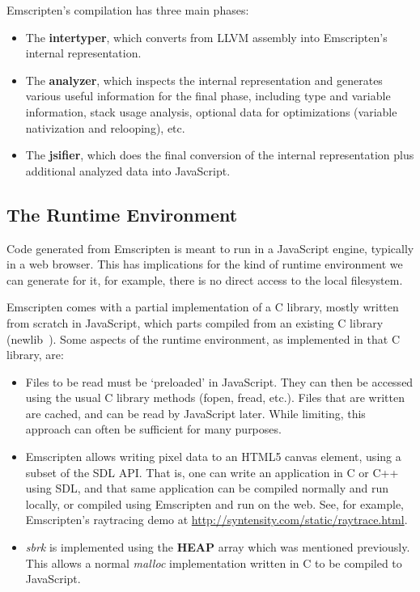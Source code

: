 \documentclass[11pt]{proc}
\begin{document}
Emscripten's compilation has three main phases:
\begin{itemize}
\item The \textbf{intertyper}, which converts from LLVM assembly into
      Emscripten's internal representation.
\item The \textbf{analyzer}, which inspects the internal representation
      and generates various useful information for the final phase,
      including type and variable information, stack usage analysis,
      optional data for optimizations
      (variable nativization and relooping), etc.
\item The \textbf{jsifier}, which does the final conversion of the
      internal representation plus additional analyzed data into JavaScript.
\end{itemize}

\subsection{The Runtime Environment}

Code generated from Emscripten is meant to run in a JavaScript engine,
typically in a web browser. This has implications for the kind of
runtime environment we can generate for it, for example, there is no
direct access to the local filesystem.

Emscripten comes with a partial implementation of a C library,
mostly written from scratch in JavaScript, which parts compiled from an
existing C library (newlib~\cite{newlib}). Some aspects of the runtime environment, as
implemented in that C library, are:
\begin{itemize}
\item Files to be read must be `preloaded' in JavaScript. They can
      then be accessed using the usual C library methods (fopen, fread, etc.).
      Files that are written are cached, and can be read by JavaScript
      later. While limiting, this approach can often be sufficient for
      many purposes.
\item Emscripten allows writing pixel data to an HTML5 canvas element,
      using a subset of the SDL API. That is, one can write an application in C or C++ using
      SDL, and that same application can be compiled normally and run
      locally, or compiled using Emscripten and run on the web. See, for
      example, Emscripten's raytracing demo at \url{http://syntensity.com/static/raytrace.html}.
\item \emph{sbrk} is implemented using the \textbf{HEAP} array which
      was mentioned previously. This allows a normal \emph{malloc}
      implementation written in C to be compiled to JavaScript.
\end{itemize}
\end{document}

